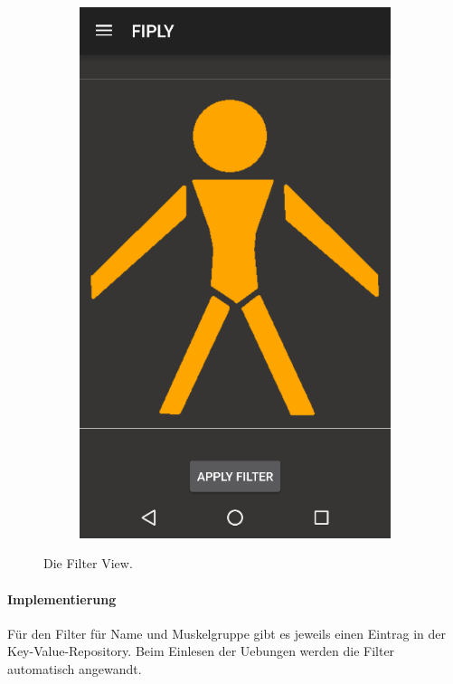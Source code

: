 \documentclass[FIPLY_base.tex]{subfiles}
\begin{document}
\begin{figure}[H]
	\begin{subfigure}[b]{0.3\textwidth}
	\includegraphics[scale=0.55]{img/Uebungskatalog_filter}
	\end{subfigure}
	\hfil
	\caption{Die Filter View.}
\end{figure}
\newpage

\paragraph{Implementierung}
Für den Filter für Name und Muskelgruppe gibt es jeweils einen Eintrag in der Key-Value-Repository.
Beim Einlesen der Uebungen werden die Filter automatisch angewandt.
\end{document}
